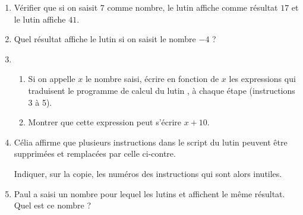 \documentclass[10pt]{article}
\begin{document}
\begin{enumerate}
\item Vérifier que si on saisit $7$ comme nombre, le lutin  affiche comme résultat $17$ et le lutin
 affiche $41$.
\item Quel résultat affiche le lutin  si on saisit le nombre $- 4$ ?
\item 
	\begin{enumerate}
		\item Si on appelle $x$ le nombre saisi, écrire en fonction de $x$ les expressions qui traduisent le programme de calcul du lutin , à chaque étape (instructions 3 à 5).
		\item Montrer que cette expression peut s'écrire $x + 10$.
	\end{enumerate}
\item Célia affirme que plusieurs instructions dans le script du lutin  peuvent être supprimées et remplacées 
par celle ci-contre.
\begin{minipage}[c][1cm][c]{6cm}
\hfill\begin{scratch}
\end{scratch}
\end{minipage}

Indiquer, sur la copie, les numéros des instructions qui sont alors inutiles.
\item  Paul a saisi un nombre pour lequel les lutins  et  affichent le même résultat. Quel
est ce nombre ?
\end{enumerate}
\end{document}
